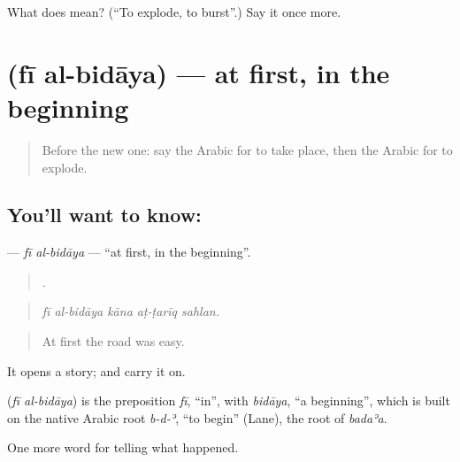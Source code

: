 \begin{tcolorbox}[breakable,colback=teal!4,colframe=teal!35!black,title={Before you move on}]
What does  mean? (\textquotedblleft{}To explode, to burst\textquotedblright{}.) Say it once more.
\end{tcolorbox}
\section[\texorpdfstring{\ar{في} \ar{البداية} (fī al-bidāya)}{في البداية (fī al-bidāya)}]{  (fī al-bidāya) — at first, in the beginning}

\label{lesson:AR-C294-fi-al-bidaya}



\begin{quote}
Before the new one: say the Arabic for to take place, then the Arabic for to explode.
\end{quote}

\subsection*{You'll want to know:  }
\textbf{ } — \emph{fī al-bidāya} — \textquotedblleft{}at first, in the beginning\textquotedblright{}.

\begin{quote}
    .
\end{quote}

\begin{quote}
\emph{fī al-bidāya kāna aṭ-ṭarīq sahlan.}
\end{quote}

\begin{quote}
At first the road was easy.
\end{quote}

It opens a story;  and   carry it on.

\begin{cousinweb}
\textbf{ } (\emph{fī al-bidāya}) is the preposition \emph{fī}, \textquotedblleft{}in\textquotedblright{}, with \emph{bidāya}, \textquotedblleft{}a beginning\textquotedblright{}, which is built on the native Arabic root \emph{b-d-ʾ}, \textquotedblleft{}to begin\textquotedblright{} (Lane), the root of \emph{badaʾa}.
\end{cousinweb}

\begin{grammarlens}[title={What you've built}]
One more word for telling what happened.
\end{grammarlens}

